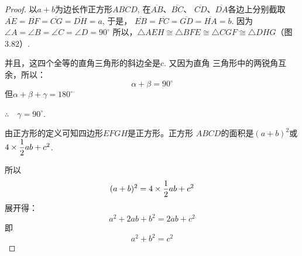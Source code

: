 \begin{proof}
    以$a+b$为边长作正方形$ABCD$, 在$\overline{AB}$、$\overline{BC}$、
$\overline{CD}$、$\overline{DA}$各边上分别截取$\overline{AE}=\overline{BF}=\overline{CG}=\overline{DH}=a$, 于是，
$\overline{EB}=\overline{FC}=\overline{GD}=\overline{HA}=b$. 因为$\angle A=\angle B=\angle C=\angle D=90^{\circ}$
所以，$\triangle AEH\cong \triangle BFE\cong \triangle CGF\cong \triangle DHG$（图3.82）.

并且，这四个全等的直角三角形的斜边全是$c$. 又因为直角
三角形中的两锐角互余，所以：
\[\alpha+\beta=90^{\circ}\]
但$\alpha+\beta+\gamma=180^{\circ}$

$\therefore\quad \gamma=90^{\circ}$.

由正方形的定义可知四边形$EFGH$是正方形。正方形
$ABCD$的面积是$(a+b)^2$或$4\times\dfrac{1}{2}ab+c^2$.

所以
\[(a+b)^2=4\times\dfrac{1}{2}ab+c^2\]
展开得：\[a^2+2ab+b^2=2ab+c^2\]
即
\[a^2+b^2=c^2\]
\end{proof}

